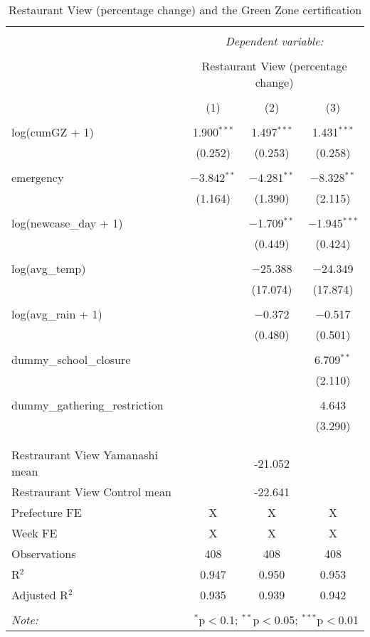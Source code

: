 
\begin{table}[!htbp] \centering 
  \caption{Restaurant View (percentage change) and the Green Zone certification} 
  \label{} 
\begin{tabular}{@{\extracolsep{-15pt}}lccc} 
\\[-1.8ex]\hline 
\hline \\[-1.8ex] 
 & \multicolumn{3}{c}{\textit{Dependent variable:}} \\ 
\cline{2-4} 
\\[-1.8ex] & \multicolumn{3}{c}{Restaurant View (percentage change) } \\ 
\\[-1.8ex] & (1) & (2) & (3)\\ 
\hline \\[-1.8ex] 
 log(cumGZ + 1) & 1.900$^{***}$ & 1.497$^{***}$ & 1.431$^{***}$ \\ 
  & (0.252) & (0.253) & (0.258) \\ 
  & & & \\ 
 emergency & $-$3.842$^{**}$ & $-$4.281$^{**}$ & $-$8.328$^{**}$ \\ 
  & (1.164) & (1.390) & (2.115) \\ 
  & & & \\ 
 log(newcase\_day + 1) &  & $-$1.709$^{**}$ & $-$1.945$^{***}$ \\ 
  &  & (0.449) & (0.424) \\ 
  & & & \\ 
 log(avg\_temp) &  & $-$25.388 & $-$24.349 \\ 
  &  & (17.074) & (17.874) \\ 
  & & & \\ 
 log(avg\_rain + 1) &  & $-$0.372 & $-$0.517 \\ 
  &  & (0.480) & (0.501) \\ 
  & & & \\ 
 dummy\_school\_closure &  &  & 6.709$^{**}$ \\ 
  &  &  & (2.110) \\ 
  & & & \\ 
 dummy\_gathering\_restriction &  &  & 4.643 \\ 
  &  &  & (3.290) \\ 
  & & & \\ 
\hline \\[-1.8ex] 
Restraurant View Yamanashi mean &  & -21.052 &  \\ 
Restraurant View Control mean &  & -22.641 &  \\ 
Prefecture FE & X & X & X \\ 
Week FE & X & X & X \\ 
Observations & 408 & 408 & 408 \\ 
R$^{2}$ & 0.947 & 0.950 & 0.953 \\ 
Adjusted R$^{2}$ & 0.935 & 0.939 & 0.942 \\ 
\hline 
\hline \\[-1.8ex] 
\textit{Note:}  & \multicolumn{3}{r}{$^{*}$p$<$0.1; $^{**}$p$<$0.05; $^{***}$p$<$0.01} \\ 
\end{tabular} 
\end{table} 
